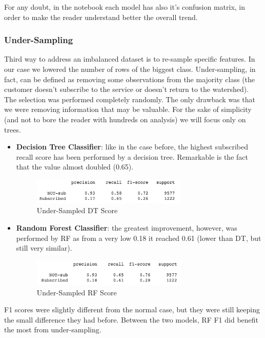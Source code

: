 \noindent For any doubt, in the notebook each model has also it's confusion matrix, in order to make the reader understand better the overall trend.

\clearpage
\subsubsection{Under-Sampling}
Third way to address an imbalanced dataset is to re-sample specific features. In our case we lowered the number of rows of the biggest class. Under-sampling, in fact, can be defined as removing some observations from the majority class (the customer doesn't subscribe to the service or doesn't return to the watershed). 
The selection was performed completely randomly. The only drawback was that we were removing information that may be valuable. For the sake of simplicity (and not to bore the reader with hundreds on analysis) we will focus only on trees.

\begin{itemize}
\item \textbf{Decision Tree Classifier}: like in the case before, the highest subscribed recall score has been performed by a decision tree. Remarkable is the fact that the value almost doubled (0.65). 

\begin{figure}[H]
\centering
\includegraphics[width=0.7\textwidth]{Img/under_tree.png}
\caption{Under-Sampled DT Score}
\end{figure}
\item \textbf{Random Forest Classifier}: the greatest improvement, however, was performed by RF as from a very low 0.18 it reached 0.61 (lower than DT, but still very similar).

\begin{figure}[H]
\centering
\includegraphics[width=0.7\textwidth]{Img/under_forest.png}
\caption{Under-Sampled RF Score}
\end{figure}
\end{itemize}

\noindent F1 scores were slightly different from the normal case, but they were still keeping the small difference they had before. Between the two models, RF F1 did benefit the most from under-sampling.

